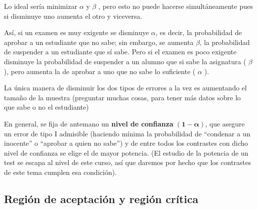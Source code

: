 \vspace{20mm}%
\begin{theorem}
	
	Lo ideal sería minimizar $\alpha$ y $\beta$ , pero esto no puede hacerse simultáneamente pues si disminuye uno aumenta el otro y viceversa.

\vspace{2mm}Así, si un examen es muy exigente se disminuye $\alpha$, es decir, la probabilidad de aprobar a un estudiante que no sabe; sin embargo, se aumenta $\beta$, la probabilidad de suspender a un estudiante que sí sabe. Pero si el examen es poco exigente disminuye la probabilidad de suspender a un alumno que si sabe la asignatura ( $\beta$ ), pero aumenta la de aprobar a uno que no sabe lo suficiente ( $\alpha$ ).

\vspace{2mm} La única manera de disminuir los dos tipos de errores a la vez es aumentando el tamaño de la muestra (preguntar muchas cosas, para tener más datos sobre lo que sabe o no el estudiante)

\vspace{2mm} En general, se fija de antemano un \textbf{nivel de confianza} $\boldsymbol{(1-\alpha)}$, que asegure un error de tipo I admisible (haciendo mínima la probabilidad de ``condenar a un inocente'' o ``aprobar a quien no sabe'') y de entre todos los contrastes con dicho nivel de confianza se elige el de mayor potencia. (El estudio de la potencia de un test se escapa al nivel de este curso, así que daremos por hecho que los contrastes de este tema cumplen esa condición).
\end{theorem}

\newpage %
\subsection{Región de aceptación y región crítica}

